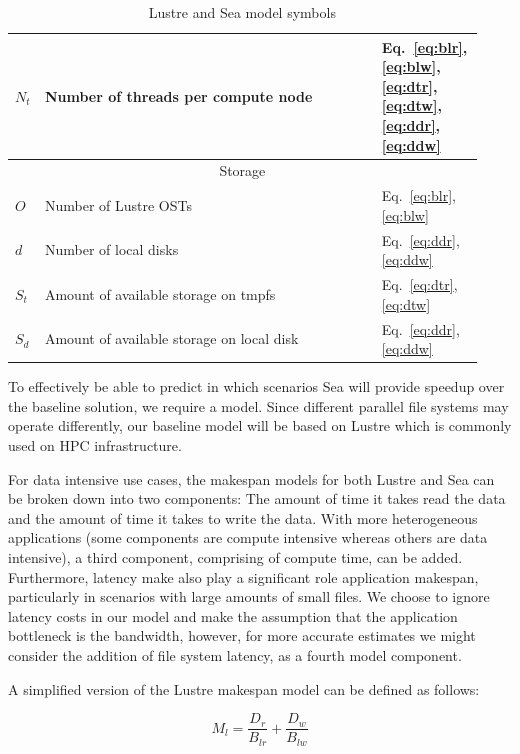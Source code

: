 \documentclass{report}
\begin{document}
\begin{table}
\begin{tabular}{|p{0.03\linewidth}|p{0.7\linewidth}|p{0.2\linewidth}|}
     $N_{t}$ & Number of threads per compute node & Eq.~\ref{eq:blr}, \ref{eq:blw}, \ref{eq:dtr}, \ref{eq:dtw}, \ref{eq:ddr}, \ref{eq:ddw}\\
     \hline
     \multicolumn{3}{|c|}{Storage} \\
     \hline
     $O$ & Number of Lustre OSTs & Eq.~\ref{eq:blr}, \ref{eq:blw}\\
     $d$ & Number of local disks & Eq.~\ref{eq:ddr}, \ref{eq:ddw}\\
     $S_{t}$ & Amount of available storage on tmpfs & Eq.~\ref{eq:dtr}, \ref{eq:dtw} \\
     $S_{d}$ & Amount of available storage on local disk & Eq.~\ref{eq:ddr}, \ref{eq:ddw} \\
     \hline
    \end{tabular}
    \caption{Lustre and Sea model symbols}
    \label{table:1}
    \end{table}

    To effectively be able to predict in which scenarios Sea will provide speedup
    over the baseline solution, we require a model. Since different parallel file
    systems may operate differently, our baseline model will be based on Lustre which
    is commonly used on HPC infrastructure.

    For data intensive use cases, the makespan models for both Lustre and Sea can be broken
    down into two components: The amount of time it takes read the data and the amount
    of time it takes to write the data. With more heterogeneous applications (some components 
    are compute intensive whereas others are data intensive), a third component, comprising
    of compute time, can be added. Furthermore, latency make also play a significant role
    application makespan, particularly in scenarios with large amounts of small files.
    We choose to ignore latency costs in our model and make the assumption that the
    application bottleneck is the bandwidth, however, for more accurate estimates we
    might consider the addition of file system latency, as a fourth model component.

    A simplified version of the Lustre makespan model can be defined as follows:

    \begin{equation}\label{eq:lustrenpc}
        M_{l} =  \frac{D_{r}}{B_{lr}} + \frac{D_{w}}{B_{lw}}
    \end{equation}

\end{document}
